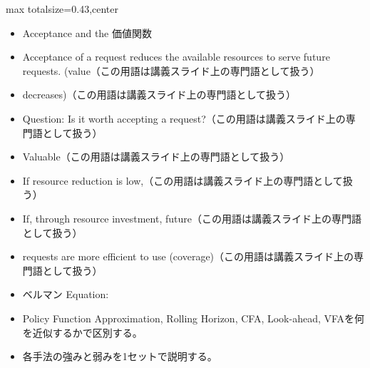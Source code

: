 \clearpage
{}
\begin{minipage}[t]{0.405\textwidth}
\begin{adjustbox}{max totalsize={\textwidth}{0.43\textheight},center}
\begin{minipage}{\textwidth}\scriptsize
{}\begin{itemize}
\item Acceptance and the 価値関数
\item Acceptance of a request reduces the available resources to serve future requests. (value（この用語は講義スライド上の専門語として扱う）
\item decreases)（この用語は講義スライド上の専門語として扱う）
\item Question: Is it worth accepting a request?（この用語は講義スライド上の専門語として扱う）
\item Valuable（この用語は講義スライド上の専門語として扱う）
\item If resource reduction is low,（この用語は講義スライド上の専門語として扱う）
\item If, through resource investment, future（この用語は講義スライド上の専門語として扱う）
\item requests are more efficient to use (coverage)（この用語は講義スライド上の専門語として扱う）
\item ベルマン Equation:
\end{itemize}\begin{itemize}
\item Policy Function Approximation, Rolling Horizon, CFA, Look-ahead, VFAを何を近似するかで区別する。
\item 各手法の強みと弱みを1セットで説明する。
\end{itemize}
\end{minipage}
\end{adjustbox}
\end{minipage}\hfill
